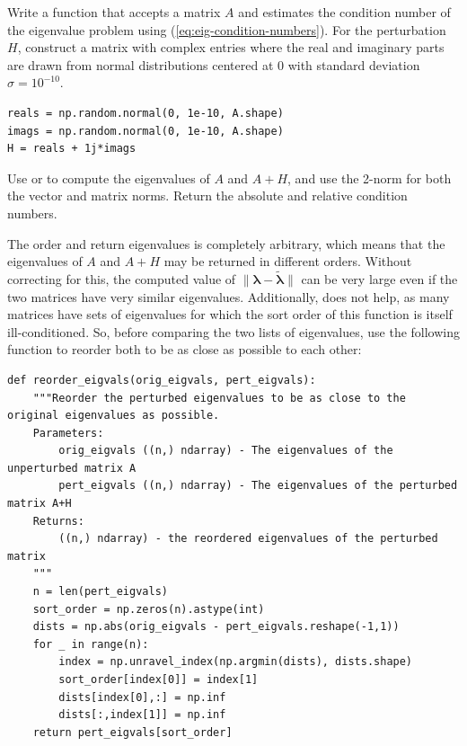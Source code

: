 \begin{problem}\label{prob:eigenvalue} %
Write a function that accepts a matrix $A$ and estimates the condition number of the eigenvalue problem using (\ref{eq:eig-condition-numbers}).
For the perturbation $H$, construct a matrix with complex entries where the real and imaginary parts are drawn from normal distributions centered at $0$ with standard deviation $\sigma = 10^{-10}$.
\begin{lstlisting}
reals = np.random.normal(0, 1e-10, A.shape)
imags = np.random.normal(0, 1e-10, A.shape)
H = reals + 1j*imags
\end{lstlisting}
Use  or  to compute the eigenvalues of $A$ and $A+H$, and use the 2-norm for both the vector and matrix norms.
Return the absolute and relative condition numbers.

The order  and  return eigenvalues is completely arbitrary, which means that the eigenvalues of $A$ and $A+H$ may be returned in different orders.
Without correcting for this, the computed value of $\|\boldsymbol{\lambda} - \tilde{\boldsymbol{\lambda}}\|$ can be very large even if the two matrices have very similar eigenvalues.
Additionally,  does not help, as many matrices have sets of eigenvalues for which the sort order of this function is itself ill-conditioned.
So, before comparing the two lists of eigenvalues, use the following function to reorder both to be as close as possible to each other:
\begin{lstlisting}
def reorder_eigvals(orig_eigvals, pert_eigvals):
    """Reorder the perturbed eigenvalues to be as close to the original eigenvalues as possible.
    Parameters:
        orig_eigvals ((n,) ndarray) - The eigenvalues of the unperturbed matrix A
        pert_eigvals ((n,) ndarray) - The eigenvalues of the perturbed matrix A+H
    Returns:
        ((n,) ndarray) - the reordered eigenvalues of the perturbed matrix
    """
    n = len(pert_eigvals)
    sort_order = np.zeros(n).astype(int)
    dists = np.abs(orig_eigvals - pert_eigvals.reshape(-1,1))
    for _ in range(n):
        index = np.unravel_index(np.argmin(dists), dists.shape)
        sort_order[index[0]] = index[1]
        dists[index[0],:] = np.inf
        dists[:,index[1]] = np.inf
    return pert_eigvals[sort_order]
\end{lstlisting}
\label{prob:eig-condit}
\end{problem}


